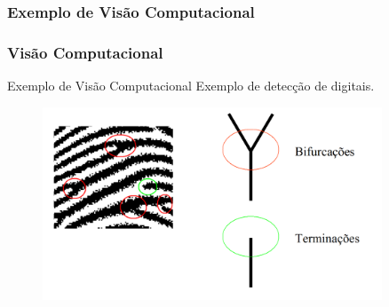 \documentclass{beamer}
\begin{document}

\subsubsection{Exemplo de Visão Computacional}
\begin{frame}
\frametitle{Visão Computacional}
	\begin{block}{Exemplo de Visão Computacional}
		Exemplo de detecção de digitais.
	\end{block}
	\begin{figure}[!h]
		\begin{center}
			\includegraphics[width=0.9\textwidth]{Figures/bifdigitais}
		\end{center}
		
	\end{figure}
	
\end{frame}

\end{document}
